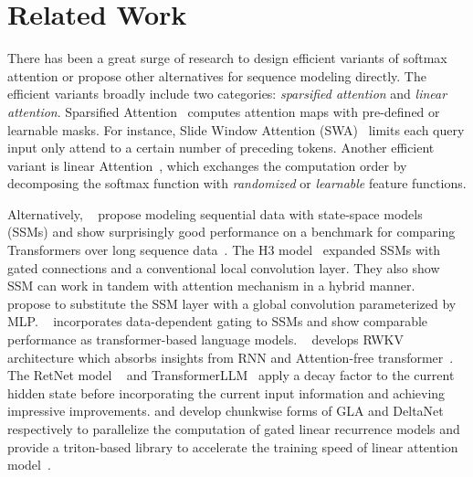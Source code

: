 \section{Related Work}
There has been a great surge of research to design efficient variants of softmax attention or propose other alternatives for sequence modeling directly. The efficient variants broadly include two categories: \textit{sparsified attention} and \textit{linear attention}. {Sparsified Attention}~\cite{longformer, BigBird, SinkhornAttn, reformer} computes attention maps with pre-defined or learnable masks. For instance, Slide Window Attention (SWA)~\cite{longformer} limits each query input only attend to a certain number of preceding tokens. Another efficient variant is linear Attention~\cite{LA_RN, performer, RFA, LLA, Transnormer, log_normal_attn}, which exchanges the computation order by decomposing the softmax function with \textit{randomized} or \textit{learnable} feature functions. 

Alternatively, ~\citet{s4d} propose modeling sequential data with state-space models (SSMs) and show surprisingly good performance on a benchmark for comparing Transformers over long sequence data~\citep{LRA, ssm_pooler}. The H3 model~\cite{H3} expanded SSMs with gated connections and a conventional local convolution layer. They also show SSM can work in tandem with attention mechanism in a hybrid manner.  ~\citet{Hyena} propose to substitute the SSM layer with a global convolution parameterized by MLP. ~\citet{mamba} incorporates data-dependent gating to SSMs and show comparable performance as transformer-based language models. ~\citet{RWKV} develops RWKV architecture which absorbs insights from RNN and Attention-free transformer~\cite{atten-free}. The RetNet model ~\cite{retnet} and TransformerLLM~\cite{qin2023transnormerllm} apply a decay factor to the current hidden state before incorporating the current input information and achieving impressive improvements. \citet{GLA_hardware} and \citet{deltanet_yang} develop chunkwise forms of GLA and DeltaNet respectively to parallelize the computation of gated linear recurrence models and provide a triton-based library to accelerate the training speed of linear attention model~\citep{triton}.

